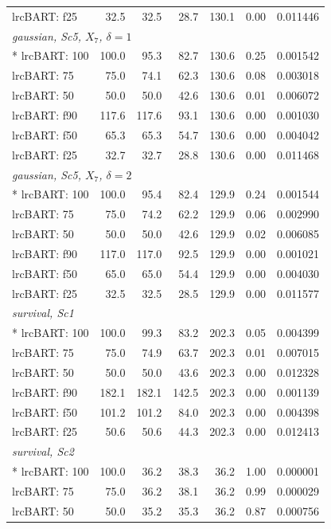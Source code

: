 \begin{longtable}{lrrrrrr}
lrcBART: f25 & 32.5 & 32.5 & 28.7 & 130.1 & 0.00 & 0.011446 \\
\multicolumn{7}{l}{\strut\textit{gaussian, Sc5, $X_7$, $\delta=1$}}\\*
lrcBART: 100 & 100.0 & 95.3 & 82.7 & 130.6 & 0.25 & 0.001542 \\
lrcBART: 75 & 75.0 & 74.1 & 62.3 & 130.6 & 0.08 & 0.003018 \\
lrcBART: 50 & 50.0 & 50.0 & 42.6 & 130.6 & 0.01 & 0.006072 \\
lrcBART: f90 & 117.6 & 117.6 & 93.1 & 130.6 & 0.00 & 0.001030 \\
lrcBART: f50 & 65.3 & 65.3 & 54.7 & 130.6 & 0.00 & 0.004042 \\
lrcBART: f25 & 32.7 & 32.7 & 28.8 & 130.6 & 0.00 & 0.011468 \\
\multicolumn{7}{l}{\strut\textit{gaussian, Sc5, $X_7$, $\delta=2$}}\\*
lrcBART: 100 & 100.0 & 95.4 & 82.4 & 129.9 & 0.24 & 0.001544 \\
lrcBART: 75 & 75.0 & 74.2 & 62.2 & 129.9 & 0.06 & 0.002990 \\
lrcBART: 50 & 50.0 & 50.0 & 42.6 & 129.9 & 0.02 & 0.006085 \\
lrcBART: f90 & 117.0 & 117.0 & 92.5 & 129.9 & 0.00 & 0.001021 \\
lrcBART: f50 & 65.0 & 65.0 & 54.4 & 129.9 & 0.00 & 0.004030 \\
lrcBART: f25 & 32.5 & 32.5 & 28.5 & 129.9 & 0.00 & 0.011577 \\
\multicolumn{7}{l}{\strut\textit{survival, Sc1}}\\*
lrcBART: 100 & 100.0 & 99.3 & 83.2 & 202.3 & 0.05 & 0.004399 \\
lrcBART: 75 & 75.0 & 74.9 & 63.7 & 202.3 & 0.01 & 0.007015 \\
lrcBART: 50 & 50.0 & 50.0 & 43.6 & 202.3 & 0.00 & 0.012328 \\
lrcBART: f90 & 182.1 & 182.1 & 142.5 & 202.3 & 0.00 & 0.001139 \\
lrcBART: f50 & 101.2 & 101.2 & 84.0 & 202.3 & 0.00 & 0.004398 \\
lrcBART: f25 & 50.6 & 50.6 & 44.3 & 202.3 & 0.00 & 0.012413 \\
\multicolumn{7}{l}{\strut\textit{survival, Sc2}}\\*
lrcBART: 100 & 100.0 & 36.2 & 38.3 & 36.2 & 1.00 & 0.000001 \\
lrcBART: 75 & 75.0 & 36.2 & 38.1 & 36.2 & 0.99 & 0.000029 \\
lrcBART: 50 & 50.0 & 35.2 & 35.3 & 36.2 & 0.87 & 0.000756 \\

\end{longtable}
